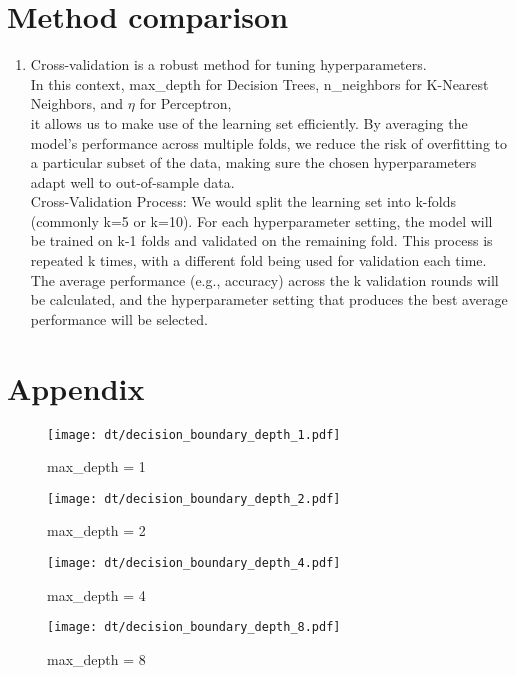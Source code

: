 \documentclass[acmconf,nonacm=true]{acmart}
\begin{document}
\section{Method comparison}
\begin{enumerate}
    \item Cross-validation is a robust method for tuning hyperparameters. \\
     In this context, max\_depth for Decision Trees, n\_neighbors for K-Nearest Neighbors, and $\eta$ for Perceptron,\\
     it allows us to make use of the learning set efficiently.
     By averaging the model's performance across multiple folds, we reduce the risk of overfitting to a particular subset of the data, making sure the chosen hyperparameters adapt well to out-of-sample data.\\
     Cross-Validation Process:
    	We would split the learning set into k-folds (commonly k=5 or k=10).
    	For each hyperparameter setting, the model will be trained on k-1 folds and validated on the remaining fold.
    	This process is repeated k times, with a different fold being used for validation each time.
    	The average performance (e.g., accuracy) across the k validation rounds will be calculated, and the hyperparameter setting that produces the best average performance will be selected.
        
\end{enumerate}


\section{Appendix}
\begin{figure}[H]
    \centering  
    \texttt{[image: dt/decision\_boundary\_depth\_1.pdf]}
    \caption{max\_depth = 1}
\end{figure}

\begin{figure}[H]
    \centering
    \texttt{[image: dt/decision\_boundary\_depth\_2.pdf]}
    \caption{max\_depth = 2}
\end{figure}

\begin{figure}[H]
    \centering
    \texttt{[image: dt/decision\_boundary\_depth\_4.pdf]}
    \caption{max\_depth = 4}
\end{figure}

\begin{figure}[H]
    \centering  
    \texttt{[image: dt/decision\_boundary\_depth\_8.pdf]}
    \caption{max\_depth = 8}
\end{figure}
\end{document}
